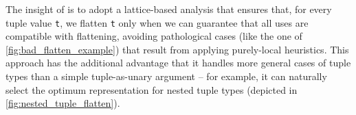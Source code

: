 




The insight of \citet{flat-paper} is to adopt a lattice-based analysis that
ensures that, for every tuple value \texttt{t}, we flatten \texttt{t} only when
we can guarantee that all uses are compatible with flattening, avoiding
pathological cases (like the one of \cref{fig:bad_flatten_example}) that result
from applying purely-local heuristics. This approach has the additional
advantage that it handles more general cases of tuple types than a simple
tuple-as-unary argument -- for example, it can naturally select the optimum
representation for nested tuple types (depicted in
\cref{fig:nested_tuple_flatten}).

